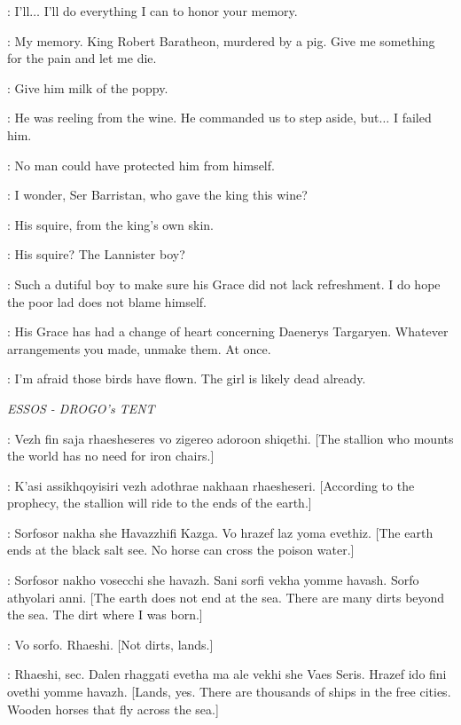 \NED: I'll$\ldots$  I'll do everything I can to honor your memory. 

\ROBERT: My memory.  King Robert Baratheon, murdered by a pig. Give me something for the pain and let me die. 


\NED: Give him milk of the poppy. 

\SELMY: He was reeling from the wine.  He commanded us to step aside, but$\ldots$  I failed him. 

\NED: No man could have protected him from himself. 

\VARYS: I wonder, Ser Barristan, who gave the king this wine? 

\SELMY: His squire, from the king's own skin. 

\NED: His squire? The Lannister boy? 

\VARYS: Such a dutiful boy to make sure his Grace did not lack refreshment.  I do hope the poor lad does not blame himself. 

\NED: His Grace has had a change of heart concerning Daenerys Targaryen.  Whatever arrangements you made, unmake them. At once. 

\VARYS: I'm afraid those birds have flown. The girl is likely dead already. 


\scene

\textit{ESSOS - DROGO's TENT} 


\DROGO: Vezh fin saja rhaesheseres vo zigereo adoroon shiqethi. [The stallion who mounts the world has no need for iron chairs.] 

\DAENERYS: K'asi assikhqoyisiri vezh adothrae nakhaan rhaesheseri. [According to the prophecy, the stallion will ride to the ends of the earth.] 

\DROGO: Sorfosor nakha she Havazzhifi Kazga. Vo hrazef laz yoma evethiz. [The earth ends at the black salt see.  No horse can cross the poison water.] 

\DAENERYS: Sorfosor nakho vosecchi she havazh. Sani sorfi vekha yomme havash. Sorfo athyolari anni. [The earth does not end at the sea.  There are many dirts beyond the sea.  The dirt where I was born.] 

\DROGO: Vo sorfo. Rhaeshi.  [Not dirts, lands.] 

\DAENERYS: Rhaeshi, sec. Dalen rhaggati evetha ma ale vekhi she Vaes Seris. Hrazef ido fini ovethi yomme havazh. [Lands, yes.  There are thousands of ships in the free cities.  Wooden horses that fly across the sea.] 

